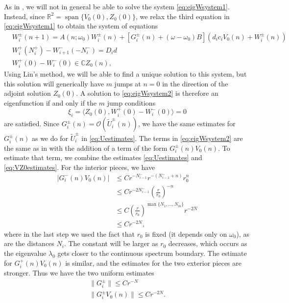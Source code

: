 \documentclass[12pt,reqno]{amsart}
\def\R{{\mathbb R}}
\def\C{{\mathbb C}}
\DeclareMathOperator{\spn}{span}
\begin{document}
As in \cites{Parker2020,Sandstede1998}, we will not in general be able to solve the system \cref{eq:eigWsystem1}. Instead, since $\R^2 = \spn\{ V_0(0), Z_0(0) \}$, we relax the third equation in \cref{eq:eigWsystem1} to obtain the system of equations
\begin{equation}\label{eq:eigWsystem2}
	\begin{aligned}
	& W_i^\pm(n+1)
	= A(n; \omega_0) W_i^\pm(n) + [G_i^\pm(n) + (\omega - \omega_0) B](d_i c_i V_0(n) + W_i^\pm(n))\\
	& W_i^+(N_i^+) - W_{i+1}^-(-N_i^-) = D_i d \\
	&W_i^+(0) - W_i^-(0) \in \C Z_0(n),
	\end{aligned}
\end{equation}
Using Lin's method, we will be able to find a unique solution to this system, but this solution will generically have $m$ jumps at $n = 0$ in the direction of the adjoint solution $Z_0(0)$. A solution to \cref{eq:eigWsystem2} is therefore an eigenfunction if and only if the $m$ jump conditions
\begin{equation}
	\xi_i = \langle Z_0(0), W_i^+(0) - W_i^-(0) \rangle = 0
\end{equation}
are satisfied. Since $G_i^\pm(n) = \mathcal{O}(\tilde{U}_i^\pm(n))$, we have the same estimates for $G_i^\pm(n)$ as we do for $\tilde{U}_i^\pm$ in \cref{eq:Uestimates}. The terms in \cref{eq:eigWsystem2} are the same as in \cite{Parker2020} with the addition of a term of the form $G_i^\pm(n) V_0(n)$. To estimate that term, we combine the estimates \cref{eq:Uestimates} and \cref{eq:VZ0estimates}. For the interior pieces, we have
\begin{align*}
| G_i^-(n) V_0(n) | &\leq C r^{-N_{i-1}^-} r^{-(N_{i-1}^- + n)} r_0^n \\
&\leq C r^{-2 N_{i-1}^-} \left(\frac{r}{r_0}\right)^{-n} \\
&\leq C \left(\frac{r}{r_0}\right)^{\max\{N_1, \dots, N_m\}} r^{-2 N} \\
&\leq C r^{-2 N} ,
\end{align*}
where in the last step we used the fact that $r_0$ is fixed (it depends only on $\omega_0$), as are the distances $N_i$. The constant will be larger as $r_0$ decreases, which occurs as the eigenvalue $\lambda_0$ gets closer to the continuous spectrum boundary. The estimate for $G_i^+(n) V_0(n)$ is similar, and the estimates for the two exterior pieces are stronger. Thus we have the two uniform estimates
\begin{equation}\label{eq:unifest}
	\begin{aligned}
		\|G_i^\pm\| \leq C r^{-N} \\
		\|G_i^\pm V_0(n) \| \leq C r^{-2 N}.
	\end{aligned}
\end{equation}
\end{document}
